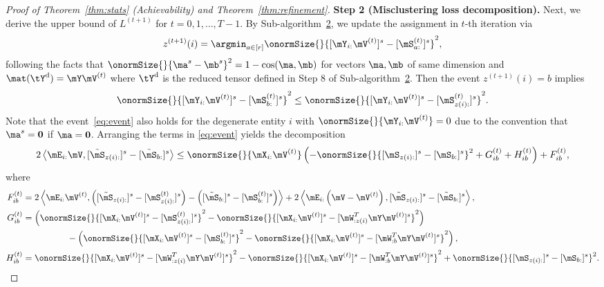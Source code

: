 \documentclass[lettersize,onecolumn,journal]{IEEEtran}
\theoremstyle{definition}
\theoremstyle{definition}
\newcommand{\of}[1]{\left(#1\right)}
\newcommand{\ang}[1]{\left\langle#1\right\rangle}
\begin{document}
\begin{proof}[Proof of Theorem~\ref{thm:stats} (Achievability) and Theorem~\ref{thm:refinement}]
{\bf Step 2 (Misclustering loss decomposition).} Next, we derive the upper bound of $L^{(t+1)}$ for $t = 0 ,1, \ldots, T-1$. By Sub-algorithm~\hyperref[alg:main]{2}, we update the assignment in $t$-th iteration via
    \begin{equation}
        z^{(t+1)}(i) = \argmin_{a \in [r]} \onormSize{}{ [ \mY_{i:} \mV^{(t)}  ]^s - [\mS_{a:}^{(t)}]^s }^2,
    \end{equation}
    following the facts that $\onormSize{}{\ma^s - \mb^s}^2 = 1 - \cos(\ma, \mb)$ for vectors $\ma,\mb$ of same dimension and $\mat(\tY^\text{d}) = \mY \mV^{(t)}$ where $\tY^\text{d}$ is the reduced tensor defined in Step 8 of Sub-algorithm~\hyperref[alg:main]{2}. Then the event $z^{(t+1)}(i) = b$ implies
    \begin{equation}\label{eq:event}
        \onormSize{}{ [ \mY_{i:} \mV^{(t)}  ]^s - [\mS_{b:}^{(t)}]^s }^2 \leq \onormSize{}{ [ \mY_{i:} \mV^{(t)}  ]^s - [\mS_{z(i):}^{(t)}]^s }^2.
    \end{equation}
Note that the event~\eqref{eq:event} also holds for the degenerate entity $i$ with $\onormSize{}{\mY_{i:} \mV^{(t)}} = 0$ due to the convention that $\ma^s = {\bf 0}$ if $\ma = {\bf 0}$. 
    Arranging the terms in \eqref{eq:event} yields the decomposition
    \begin{equation}\label{eq:decomp}
        2 \ang{ \mE_{i:} \mV, [  \tilde \mS_{z(i):} ]^s - [  \tilde \mS_{b:} ]^s } \leq \onormSize{}{\mX_{i:} \mV^{(t)}} \of{ - \onormSize{}{ [ \mS_{z(i):}  ]^s - [ \mS_{b:}  ]^s  }^2 + G_{ib}^{(t)} + H_{ib}^{(t)} } +  F_{ib}^{(t)},
    \end{equation}
    where
    \begin{align}
        F_{ib}^{(t)} &= 2 \ang{\mE_{i:} \mV^{(t)}, \of{ [  \tilde \mS_{z(i):} ]^s  -  [  \mS_{z(i):}^{(t)} ]^s  }  - \of{  [  \tilde \mS_{b:} ]^s  -  [  \mS_{b:}^{(t)} ]^s  }  }  + 2 \ang{ \mE_{i:} \of{ \mV - \mV^{(t)} }, [  \tilde \mS_{z(i):} ]^s - [  \tilde \mS_{b:} ]^s  }, \label{eq:f}\\
        G_{ib}^{(t)} &=   \of{ \onormSize{}{ [\mX_{i:} \mV^{(t)}]^s -  [  \mS_{z(i):}^{(t)}  ]^s}^2 -  \onormSize{}{ [\mX_{i:} \mV^{(t)}]^s -  [  \mW_{:z(i)}^T \mY \mV^{(t)} ]^s}^2}   \\
        & \quad \quad \quad \quad \quad -   \of{ \onormSize{}{ [\mX_{i:} \mV^{(t)}]^s -  [  \mS_{b:}^{(t)}  ]^s}^2 -  \onormSize{}{ [\mX_{i:} \mV^{(t)}]^s -  [  \mW_{:b}^T \mY \mV^{(t)} ]^s}^2 }, \label{eq:g} \\
        H_{ib}^{(t)} &=   \onormSize{}{ [\mX_{i:} \mV^{(t)}]^s -  [  \mW_{:z(i)}^T \mY \mV^{(t)} ]^s}^2 - \onormSize{}{ [\mX_{i:} \mV^{(t)}]^s -  [  \mW_{:b}^T \mY \mV^{(t)} ]^s}^2  + \onormSize{}{ [ \mS_{z(i):}  ]^s - [ \mS_{b:}  ]^s  }^2 . \label{eq:h}
    \end{align}


\end{proof}
\end{document}
